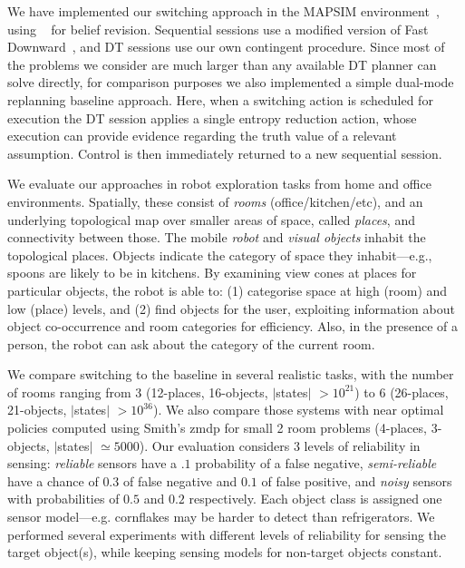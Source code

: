 
We have implemented our switching approach in the MAPSIM
environment~\cite{brenner:nebel:jaamas09},
using ~\cite{king:2009} for belief
revision. Sequential sessions use a modified version of Fast
Downward~\cite{fast-downward}, and DT sessions use our own contingent
procedure. Since most of the problems we consider are much larger than
any available DT planner can solve directly, for comparison purposes
we also implemented a simple dual-mode replanning baseline
approach. Here, when a switching action is scheduled for execution the
DT session applies a single entropy reduction action, whose execution
can provide evidence regarding the truth value of a relevant
assumption.
Control is then immediately
returned to a new sequential session.


We evaluate our approaches in robot exploration tasks from home and
office environments. Spatially, these consist of {\em rooms}
(office/kitchen/etc), and an underlying topological map over
smaller areas of space, called {\em places}, and connectivity between
those. The mobile {\em robot} and {\em visual objects} inhabit the
topological places. Objects indicate the category of space they
inhabit---e.g., spoons are likely to be in kitchens. By examining
view cones at places for particular objects, the robot is able to: (1)
categorise space at high (room) and low (place) levels, and (2) find
objects for the user, exploiting information about object
co-occurrence and room categories for efficiency. Also, in the
presence of a person, the robot can ask about the category of the
current room.


We compare switching to the baseline in several realistic
tasks, with the number of rooms ranging from 3 (12-places, 16-objects,
$|$states$|$ $>10^{21}$) to 6 (26-places, 21-objects, $|$states$|$
$>10^{36}$). We also compare those systems with near optimal policies
computed using Smith's {\sc zmdp} for small 2 room problems (4-places,
3-objects, $|$states$|$ $\simeq 5000$). Our evaluation considers 3
levels of reliability in sensing: {\em reliable} sensors have a $.1$
probability of a false negative, {\em semi-reliable} have a chance of
$0.3$ of false negative and $0.1$ of false positive, and {\em noisy}
sensors with probabilities of $0.5$ and $0.2$ respectively. Each
object class is assigned one sensor model---e.g. cornflakes may be
harder to detect than refrigerators. We performed several experiments
with different levels of reliability for sensing the target object(s),
while keeping sensing models for non-target objects constant.

